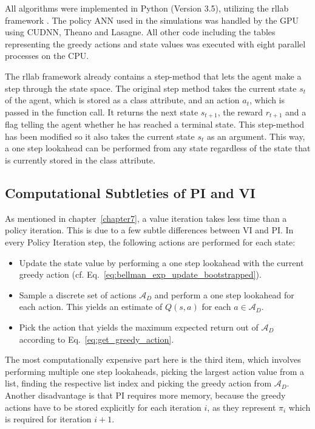 All algorithms were implemented in Python (Version 3.5), utilizing the rllab framework \cite{rllab2018}. The policy ANN used in the simulations was handled by the GPU using CUDNN, Theano and Lasagne. All other code including the tables representing the greedy actions and state values was executed with eight parallel processes on the CPU. \smallbreak

The rllab framework already contains a step-method that lets the agent make a step through the state space. The original step method takes the current state $s_t$ of the agent, which is stored as a class attribute, and an action $a_t$, which is passed in the function call. It returns the next state $s_{t+1}$, the reward $r_{t+1}$ and a flag telling the agent whether he has reached a terminal state. This step-method has been modified so it also takes the current state $s_t$ as an argument. This way, a one step lookahead can be performed from any state regardless of the state that is currently stored in the class attribute.

\subsection{Computational Subtleties of PI and VI}

As mentioned in chapter~\ref{chapter7}, a value iteration takes less time than a policy iteration. This is due to a few subtle differences between VI and PI. In every Policy Iteration step, the following actions are performed for each state:

\begin{itemize}
	\item Update the state value by performing a one step lookahead with the current greedy action (cf. Eq.~\ref{eq:bellman_exp_update_bootstrapped}).
	\item Sample a discrete set of actions $\mathcal{A}_D$ and perform a one step lookahead for each action. This yields an estimate of $Q(s,a)$ for each $a\in \mathcal{A}_D$.
	\item Pick the action that yields the maximum expected return out of $\mathcal{A}_D$ according to Eq.~\ref{eq:get_greedy_action}.
\end{itemize}

The most computationally expensive part here is the third item, which involves performing multiple one step lookaheads, picking the largest action value from a list, finding the respective list index and picking the greedy action from $\mathcal{A}_D$. Another disadvantage is that PI requires more memory, because the greedy actions have to be stored explicitly for each iteration $i$, as they represent $\pi_i$ which is required for iteration $i+1$.\bigbreak

